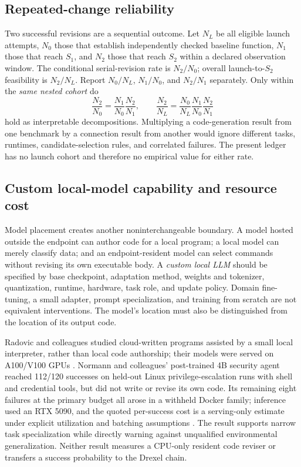 \documentclass[11pt,letterpaper]{article}
\begin{document}
\subsection{Repeated-change reliability}

Two successful revisions are a sequential outcome. Let $N_L$ be all eligible launch attempts, $N_0$ those that establish independently checked baseline function, $N_1$ those that reach $S_1$, and $N_2$ those that reach $S_2$ within a declared observation window. The conditional serial-revision rate is $N_2/N_0$; overall launch-to-$S_2$ feasibility is $N_2/N_L$. Report $N_0/N_L$, $N_1/N_0$, and $N_2/N_1$ separately. Only within the \emph{same nested cohort} do
\begin{equation}
\frac{N_2}{N_0}=\frac{N_1}{N_0}\frac{N_2}{N_1},\qquad
\frac{N_2}{N_L}=\frac{N_0}{N_L}\frac{N_1}{N_0}\frac{N_2}{N_1}
\end{equation}
hold as interpretable decompositions. Multiplying a code-generation result from one benchmark by a connection result from another would ignore different tasks, runtimes, candidate-selection rules, and correlated failures. The present ledger has no launch cohort and therefore no empirical value for either rate.

\subsection{Custom local-model capability and resource cost}

Model placement creates another noninterchangeable boundary. A model hosted outside the endpoint can author code for a local program; a local model can merely classify data; and an endpoint-resident model can select commands without revising its own executable body. A \emph{custom local LLM} should be specified by base checkpoint, adaptation method, weights and tokenizer, quantization, runtime, hardware, task role, and update policy. Domain fine-tuning, a small adapter, prompt specialization, and training from scratch are not equivalent interventions. The model's location must also be distinguished from the location of its output code.

Radovic and colleagues studied cloud-written programs assisted by a small local interpreter, rather than local code authorship; their models were served on A100/V100 GPUs \cite{radovic}. Normann and colleagues' post-trained 4B security agent reached 112/120 successes on held-out Linux privilege-escalation runs with shell and credential tools, but did not write or revise its own code. Its remaining eight failures at the primary budget all arose in a withheld Docker family; inference used an RTX 5090, and the quoted per-success cost is a serving-only estimate under explicit utilization and batching assumptions \cite{normann}. The result supports narrow task specialization while directly warning against unqualified environmental generalization. Neither result measures a CPU-only resident code reviser or transfers a success probability to the Drexel chain.
\end{document}
